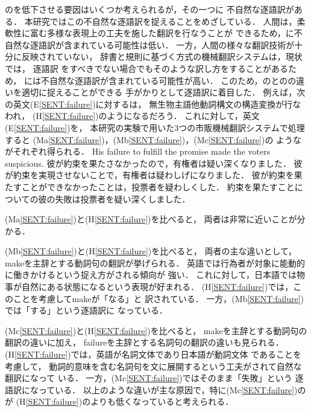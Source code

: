 \documentclass[japanese]{jnlp_1.4}
\newcommand{\FLU}{}
\newcommand{\HUM}{}
\newcommand{\MT}{}
\newenvironment{SENT3}{}{}
\begin{document}
{\MT}の{\FLU}を低下させる要因はいくつか考えられるが，その一つに
不自然な逐語訳がある．
本研究ではこの不自然な逐語訳を捉えることをめざしている．
人間は，柔軟性に富む多様な表現上の工夫を施した翻訳を行なうことが
できるため，{\HUM}に不自然な逐語訳が含まれている可能性は低い．
一方，人間の様々な翻訳技術が十分に反映されていない，
辞書と規則に基づく方式の機械翻訳システムは，現状では，
逐語訳
をすべきでない場合でもそのような訳し方をすることがあるため，
{\MT}には不自然な逐語訳が含まれている可能性が高い．
このため，{\HUM}の{\FLU}と{\MT}の{\FLU}の違いを適切に捉えることができる
手がかりとして逐語訳に着目した．
例えば，次の英文(E\ref{SENT:failure})に対する{\HUM}は，
無生物主語他動詞構文の構造変換が行なわれ，
(H\ref{SENT:failure})のようになるだろう．
これに対して，英文(E\ref{SENT:failure})を，
本研究の実験で用いた3つの市販機械翻訳システムで処理すると
(Ma\ref{SENT:failure})，(Mb\ref{SENT:failure})，(Mc\ref{SENT:failure})の
ような{\MT}がそれぞれ得られる．
\begin{SENT3}
\sentE His failure to fulfill the promise made the voters suspicious.
\sentH 彼が約束を果たさなかったので，有権者は疑い深くなりました．
\sentMa 彼が約束を実現させないことで，有権者は疑わしげになりました．
\sentMb 彼が約束を果たすことができなかったことは，投票者を疑わしくした．
\sentMc 約束を果たすことについての彼の失敗は投票者を疑い深くしました．
\label{SENT:failure}
\end{SENT3}

{\MT}(Ma\ref{SENT:failure})と{\HUM}(H\ref{SENT:failure})を比べると，
両者は非常に近いことが分かる．

{\MT}(Mb\ref{SENT:failure})と{\HUM}(H\ref{SENT:failure})を比べると，
両者の主な違いとして，makeを主辞とする動詞句の翻訳が挙げられる．
英語では行為者が対象に能動的に働きかけるという捉え方がされる傾向が
強い．
これに対して，日本語では物事が自然にある状態になるという表現が好まれる．
{\HUM}(H\ref{SENT:failure})では，このことを考慮してmakeが「なる」と
訳されている．
一方，{\MT}(Mb\ref{SENT:failure})では「する」という逐語訳に
なっている．

{\MT}(Mc\ref{SENT:failure})と{\HUM}(H\ref{SENT:failure})を比べると，
makeを主辞とする動詞句の翻訳の違いに加え，
failureを主辞とする名詞句の翻訳の違いも見られる．
{\HUM}(H\ref{SENT:failure})では，英語が名詞文体であり日本語が動詞文体
であることを考慮して，
動詞的意味を含む名詞句を文に展開するという工夫がされて自然な翻訳になって
いる．
一方，{\MT}(Mc\ref{SENT:failure})ではそのまま「失敗」という
逐語訳になっている．
以上のような違いが主な原因で，特に{\MT}(Mc\ref{SENT:failure})の{\FLU}が
{\HUM}(H\ref{SENT:failure})の{\FLU}よりも低くなっていると考えられる．
\end{document}
